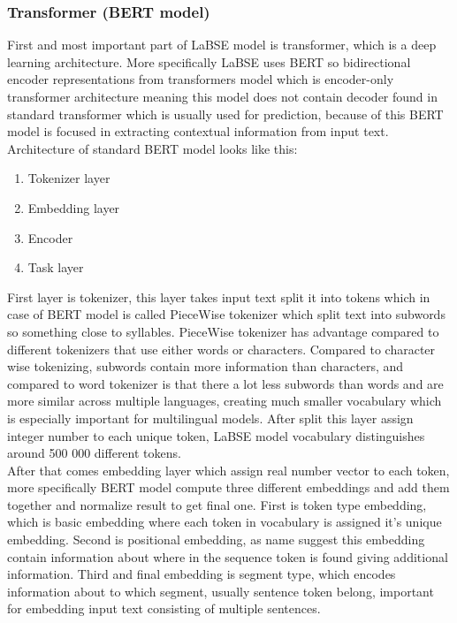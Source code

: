 \subsubsection{Transformer (BERT model)}

First and most important part of LaBSE model is transformer, which is a deep learning architecture. More specifically LaBSE uses BERT so bidirectional encoder representations from transformers model which is encoder-only transformer architecture meaning this model does not contain decoder found in standard transformer which is usually used for prediction, because of this BERT model is focused in extracting contextual information from input text. Architecture of standard BERT model looks like this: 
\\

\begin{enumerate}
	\item Tokenizer layer
	\item Embedding layer
	\item Encoder
	\item Task layer
\end{enumerate}

First layer is tokenizer, this layer takes input text split it into tokens which in case of BERT model is called PieceWise tokenizer which split text into subwords so something close to syllables. PieceWise tokenizer has advantage compared to different tokenizers that use either words or characters. Compared to character wise tokenizing, subwords contain more information than characters, and compared to word tokenizer is that there a lot less subwords than words and are more similar across multiple languages, creating much smaller vocabulary which is especially important for multilingual models. After split this layer assign integer number to each unique token, LaBSE model vocabulary distinguishes around 500 000 different tokens.
\\

After that comes embedding layer which assign real number vector to each token, more specifically BERT model compute three different embeddings and add them together and normalize result to get final one. First is token type embedding, which is basic embedding where each token in vocabulary is assigned it's unique embedding. Second is positional embedding, as name suggest this embedding contain information about where in the sequence token is found giving additional information. Third and final embedding is segment type, which encodes information about to which segment, usually sentence token belong, important for embedding input text consisting of multiple sentences.
\\

